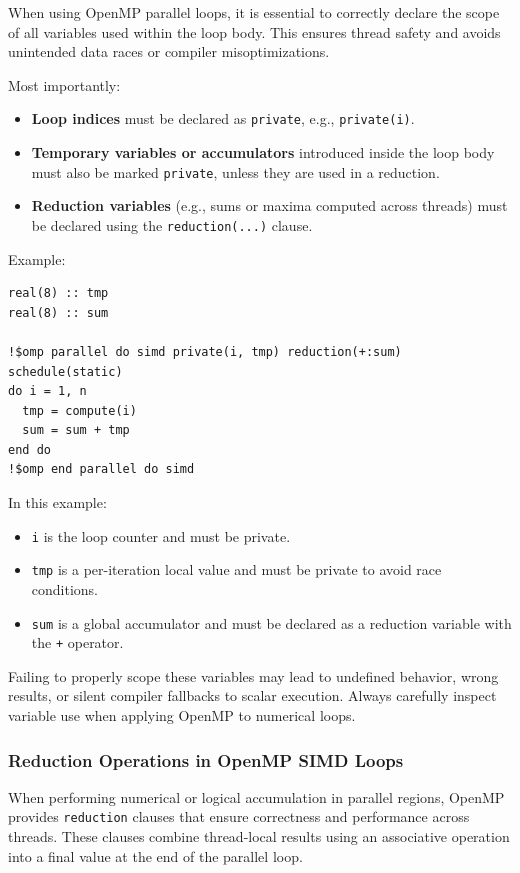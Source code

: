 \documentclass{article}
\begin{document}
When using OpenMP parallel loops, it is essential to correctly declare the scope of all variables used within the loop body. This ensures thread safety and avoids unintended data races or compiler misoptimizations.

Most importantly:

\begin{itemize}
  \item \textbf{Loop indices} must be declared as \texttt{private}, e.g., \texttt{private(i)}.
  \item \textbf{Temporary variables or accumulators} introduced inside the loop body must also be marked \texttt{private}, unless they are used in a reduction.
  \item \textbf{Reduction variables} (e.g., sums or maxima computed across threads) must be declared using the \texttt{reduction(...)} clause.
\end{itemize}

\noindent
Example:
\begin{verbatim}
real(8) :: tmp
real(8) :: sum

!$omp parallel do simd private(i, tmp) reduction(+:sum) schedule(static)
do i = 1, n
  tmp = compute(i)
  sum = sum + tmp
end do
!$omp end parallel do simd
\end{verbatim}

In this example:
\begin{itemize}
  \item \texttt{i} is the loop counter and must be private.
  \item \texttt{tmp} is a per-iteration local value and must be private to avoid race conditions.
  \item \texttt{sum} is a global accumulator and must be declared as a reduction variable with the \texttt{+} operator.
\end{itemize}

Failing to properly scope these variables may lead to undefined behavior, wrong results, or silent compiler fallbacks to scalar execution. Always carefully inspect variable use when applying OpenMP to numerical loops.

\subsubsection{Reduction Operations in OpenMP SIMD Loops}

When performing numerical or logical accumulation in parallel regions, OpenMP provides \texttt{reduction} clauses that ensure correctness and performance across threads. These clauses combine thread-local results using an associative operation into a final value at the end of the parallel loop.
\end{document}

